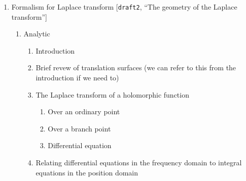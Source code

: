 \documentclass{article}
\theoremstyle{definition}
\begin{document}
\begin{enumerate}
\begin{itemize}
\begin{itemize}
\item motivation
\begin{itemize}
\item In the classical theory of special functions, exponential integrals are often used to express solutions of linear differential and difference equations.
\item In physics ??
\item Geometrically they represent a Poincar\'e pairing (as explained by Kontsevich in \textbf{IHES lectures}).
\end{itemize}
\end{itemize}
\item What is the class of ODEs that we study? \textcolor{gray}{has to be done}
\item State results about resurgence of exponential integrals and Stokes phenomena
\begin{itemize}
\item Thimbles integrals [Kontsevich]: geometric computation of Stokes constants \textcolor{gray}{has to be done}
\item ODE and fractional derivative formula [{\tt draft2}]
\item if hypergeometric functions appear in a large class of examples: integral formulas for hypergeometric functions \textcolor{gray}{has to be done}
\end{itemize}
\end{itemize}
\item Formalism for Laplace transform [{\tt draft2}, ``The geometry of the Laplace transform'']
\begin{enumerate}
\item Analytic
\begin{enumerate}
\item Introduction
\item Brief revew of translation surfaces (we can refer to this from the introduction if we need to)
\item The Laplace transform of a holomorphic function
\begin{enumerate}
\item Over an ordinary point
\item Over a branch point
\item Differential equation
\end{enumerate}
\item Relating differential equations in the frequency domain to integral equations in the position domain

\end{enumerate}
\end{enumerate}
\end{enumerate}
\end{document}
